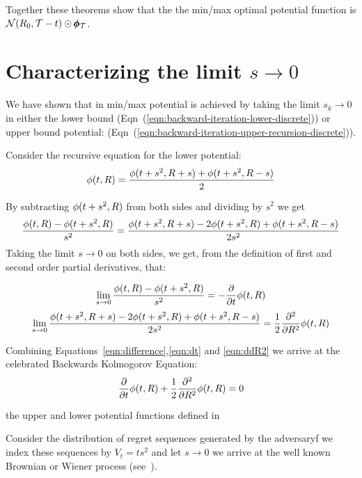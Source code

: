 \documentclass{article}[12pt]
\begin{document}
Together these theorems show that the the min/max optimal potential function is $ {\cal N}(R_0,\mathcal{T}-t) \odot \pmb{\phi}_{\mathcal{T}}$.

\section{Characterizing the limit $s \to 0$}
\label{sec:continuous}

We have shown that in min/max potential is achieved by taking the
limit $s_k \to 0$ in either the lower bound
(Eqn~(\ref{eqn:backward-iteration-lower-discrete})) or upper bound
potential:
(Eqn~(\ref{eqn:backward-iteration-upper-recursion-discrete})).

Consider the recursive equation for the lower potential:
 \begin{equation}
   \phi(t, R) =  \frac{\phi(t+s^2,R+s) + \phi(t+s^2,R-s)}{2}
 \end{equation}

 By subtracting $\phi(t+s^2,R)$ from both sides and dividing by $s^2$ we get 
 \begin{equation}
   \frac{\phi(t, R)  - \phi(t+s^2,R)}{s^2} =  \frac{\phi(t+s^2,R+s) - 2\phi(t+s^2,R)+\phi(t+s^2,R-s)}{2s^2} \label{eqn:difference}
 \end{equation}
 Taking the limit $s \to 0$ on both sides, we get, from the definition of first and second order partial derivatives, that:

 \begin{equation}
   \lim_{s \to 0}\frac{\phi(t, R)  - \phi(t+s^2,R)}{s^2} =  -\frac{\partial}{\partial t} \phi(t,R)
   \label{eqn:dt}
   \end{equation}
 \begin{equation}
   \lim_{s \to 0}
   \frac{\phi(t+s^2,R+s) - 2\phi(t+s^2,R)+\phi(t+s^2,R-s)}{2s^2}
   =  \frac{1}{2} \frac{\partial^2}{\partial R^2} \phi(t,R)
\label{eqn:ddR2}
 \end{equation}

Combining Equations~\ref{eqn:difference},\ref{eqn:dt} and \ref{eqn:ddR2} we arrive at the  
 celebrated Backwards Kolmogorov Equation:
\begin{equation} \label{eqn:Kolmogorov}
  \frac{\partial}{\partial t} \phi(t,R)
  + \frac{1}{2} \frac{\partial^2}{\partial R^2} \phi(t,R)=0
\end{equation}

the upper and lower
potential functions defined in

Consider the distribution of regret sequences generated by the adversaryf we index these sequences by $V_t = ts^2$ and let $s \to 0$ we arrive at the well known Brownian or Wiener process
(see~\cite{kac1947random}).
\end{document}
